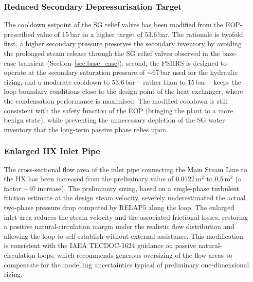 \documentclass[a4paper,11pt]{article}
\numberwithin{subsubsection}{subsection}
\numberwithin{subsection}{section}
\begin{document}
\subsubsection{Reduced Secondary Depressurisation Target}
The cooldown setpoint of the SG relief valves has been modified
from the EOP-prescribed value of 15\,bar to a higher target of
53.6\,bar. The rationale is twofold: first, a higher secondary
pressure preserves the secondary inventory by avoiding the
prolonged steam release through the SG relief valves observed in
the base-case transient (Section~\ref{sec:base_case}); second, the
PSHRS is designed to operate at the secondary saturation pressure
of $\sim$67\,bar used for the hydraulic sizing, and a moderate
cooldown to 53.6\,bar -- rather than to 15\,bar -- keeps the loop
boundary conditions close to the design point of the heat
exchanger, where the condensation performance is maximised. The
modified cooldown is still consistent with the safety function of
the EOP (bringing the plant to a more benign state), while
preventing the unnecessary depletion of the SG water inventory
that the long-term passive phase relies upon.

\subsubsection{Enlarged HX Inlet Pipe}
The cross-sectional flow area of the inlet pipe connecting the
Main Steam Line to the HX has been increased from the preliminary
value of 0.0122\,m$^{2}$ to 0.5\,m$^{2}$ (a factor $\sim 40$
increase). The preliminary sizing, based on a single-phase
turbulent friction estimate at the design steam velocity, severely
underestimated the actual two-phase pressure drop computed by
RELAP5 along the loop. The enlarged inlet area reduces the steam
velocity and the associated frictional losses, restoring a
positive natural-circulation margin under the realistic flow
distribution and allowing the loop to self-establish without
external assistance. This modification is consistent with the IAEA
TECDOC-1624 guidance on passive natural-circulation loops, which
recommends generous oversizing of the flow areas to compensate for
the modelling uncertainties typical of preliminary one-dimensional
sizing.
\end{document}
